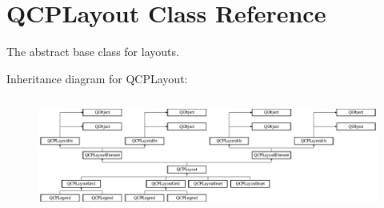\hypertarget{class_q_c_p_layout}{}\section{Q\+C\+P\+Layout Class Reference}
\label{class_q_c_p_layout}


The abstract base class for layouts.  


Inheritance diagram for Q\+C\+P\+Layout\+:\begin{figure}[H]
\begin{center}
\leavevmode
\includegraphics[height=3.798450cm]{class_q_c_p_layout}
\end{center}
\end{figure}
